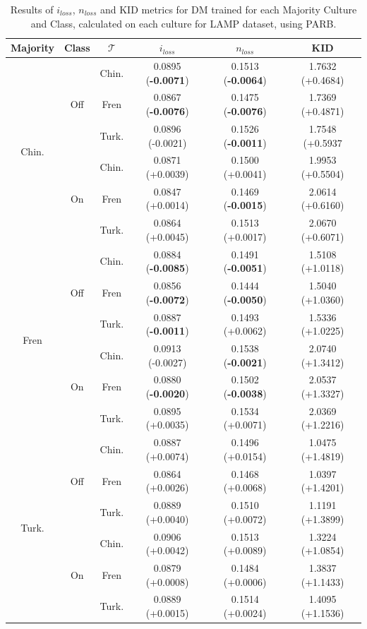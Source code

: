 %
\begin{table}[H]
\centering
\begin{tabular}{c|c|c|c|c|c}
    \textbf{Majority} & \textbf{Class} & \textbf{$\mathcal{T}$} & \textbf{$i_{loss}$} & \textbf{$n_{loss}$} & \textbf{KID} \\
    \toprule
\multirow{6}{*}{Chin.} & \multirow{3}{*}{Off}  & Chin. & 0.0895 (\textbf{-0.0071})       & 0.1513 (\textbf{-0.0064})       & 1.7632 (+0.4684)  \\
 &  & Fren & 0.0867 (\textbf{-0.0076})       & 0.1475 (\textbf{-0.0076})       & 1.7369 (+0.4871) \\
 &  & Turk. & 0.0896 (-0.0021)       & 0.1526 (\textbf{-0.0011})       & 1.7548 (+0.5937 \\
\hhline{~-----}
 & \multirow{3}{*}{On} & Chin. & 0.0871 (+0.0039)       & 0.1500 (+0.0041)       & 1.9953 (+0.5504) \\
 &  & Fren & 0.0847 (+0.0014)       & 0.1469 (\textbf{-0.0015})       & 2.0614 (+0.6160) \\
 &  & Turk. & 0.0864 (+0.0045)       & 0.1513 (+0.0017)       & 2.0670 (+0.6071) \\
\midrule
\multirow{6}{*}{Fren} & \multirow{3}{*}{Off} & Chin. &  0.0884 (\textbf{-0.0085})       & 0.1491 (\textbf{-0.0051})       & 1.5108 (+1.0118)  \\
 &  & Fren & 0.0856 (\textbf{-0.0072})       & 0.1444 (\textbf{-0.0050})       & 1.5040 (+1.0360) \\
 &  & Turk. &0.0887 (\textbf{-0.0011})       & 0.1493 (+0.0062)       & 1.5336 (+1.0225)  \\
\hhline{~-----}
 & \multirow{3}{*}{On} & Chin. &0.0913 (-0.0027)       & 0.1538 (\textbf{-0.0021})       & 2.0740 (+1.3412) \\
 &  & Fren & 0.0880 (\textbf{-0.0020})       & 0.1502 (\textbf{-0.0038})       & 2.0537 (+1.3327) \\
 &  & Turk. & 0.0895 (+0.0035)       & 0.1534 (+0.0071)       & 2.0369 (+1.2216)  \\
\midrule
\multirow{6}{*}{Turk.} & \multirow{3}{*}{Off}& Chin. & 0.0887 (+0.0074)       & 0.1496 (+0.0154)       & 1.0475 (+1.4819)  \\
 &  & Fren & 0.0864 (+0.0026)       & 0.1468 (+0.0068)       & 1.0397 (+1.4201) \\
 &  & Turk. & 0.0889 (+0.0040)       & 0.1510 (+0.0072)       & 1.1191 (+1.3899) \\
\hhline{~-----}
 & \multirow{3}{*}{On} & Chin. &0.0906 (+0.0042)       & 0.1513 (+0.0089)       & 1.3224 (+1.0854) \\
 &  & Fren &  0.0879 (+0.0008)       & 0.1484 (+0.0006)       & 1.3837 (+1.1433) \\
 &  & Turk. & 0.0889 (+0.0015)       & 0.1514 (+0.0024)       & 1.4095 (+1.1536) \\
\bottomrule
    \end{tabular}
    \caption{Results of $i_{loss}$, $n_{loss}$ and KID metrics for DM trained for each Majority Culture and Class, calculated on each culture for LAMP dataset, using PARB.}
    \label{ch3:tab:genDMPARB}
\end{table}
